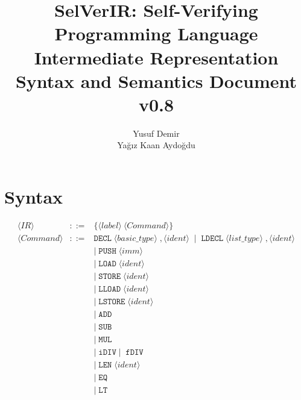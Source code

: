 \documentclass{article}
\title{SelVerIR: Self-Verifying Programming Language \\ Intermediate Representation Syntax and Semantics Document \\ v0.8}
\author{Yusuf Demir \\ Yağız Kaan Aydoğdu}
\begin{document}
\maketitle


\newpage
\section{Syntax}

\[
\begin{array}{rcl}

\langle \mathit{IR} \rangle &::=& \{\langle \mathit{label} \rangle\ \langle \mathit{Command} \rangle\} \\[6pt]

\langle \mathit{Command} \rangle
&::=& \texttt{DECL} \; \langle basic\_type \rangle \; , \langle ident \rangle \;\mid\; \texttt{LDECL} \; \langle list\_type \rangle \; , \langle ident \rangle
\\[2pt]

&& \mid\; \texttt{PUSH} \; \langle imm \rangle
\\[2pt]

&& \mid\; \texttt{LOAD} \; \langle ident \rangle
\\[2pt]

&& \mid\; \texttt{STORE} \; \langle ident \rangle
\\[2pt]

&& \mid\; \texttt{LLOAD} \; \langle ident \rangle
\\[2pt]

&& \mid\; \texttt{LSTORE} \; \langle ident \rangle
\\[2pt]

&& \mid\; \texttt{ADD}
\\[2pt]

&& \mid\; \texttt{SUB}
\\[2pt]

&& \mid\; \texttt{MUL}
\\[2pt]

&& \mid\; \texttt{iDIV} \mid\; \texttt{fDIV}
\\[2pt]

&& \mid\; \texttt{LEN} \; \langle ident \rangle
\\[2pt]

&& \mid\; \texttt{EQ}
\\[2pt]

&& \mid\; \texttt{LT}
\\[2pt]


\end{array}\]
\end{document}
